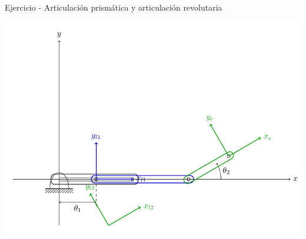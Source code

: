 \documentclass[presentation,aspectratio=169]{beamer}
\begin{document}
\begin{frame}[label={sec:orgd477906}]{Ejercicio - Articulación prismática y articulación revolutaria}
\begin{center}
 \includegraphics[height=0.8\textheight]{../figures/2d-2dof-prismatic-revolute.pdf}
\end{center}
\end{frame}
\end{document}
